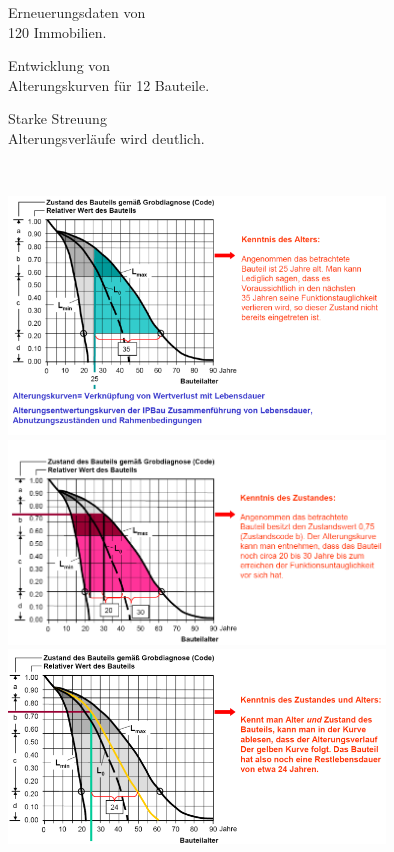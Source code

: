 \documentclass[fleqn,twoside,dvipsnames]{article}
\begin{document}
\begin{itemize}
\begin{itemize}
\begin{minipage}{0.3\textwidth}
                            \item Erneuerungsdaten von \\120 Immobilien.
                            \item Entwicklung von \\Alterungskurven für 12 Bauteile.
                            \item Starke Streuung \\Alterungsverläufe wird deutlich.
                        \end{minipage}\\
                \end{itemize}
                    \includegraphics[width=0.75\textwidth]{Grafiken/Verfahren zur Bestimmung von Bauteillebensdauern/IPBau 2.png}\\
                    \includegraphics[width=0.75\textwidth]{Grafiken/Verfahren zur Bestimmung von Bauteillebensdauern/IPBau 3.png}\\
                    \includegraphics[width=0.75\textwidth]{Grafiken/Verfahren zur Bestimmung von Bauteillebensdauern/IPBau 4.png}
        \end{itemize}
    
\end{document}
